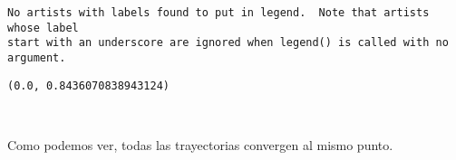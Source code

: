 \documentclass[11pt]{article}
\makeatletter
\newcommand{\boxspacing}{\kern\kvtcb@left@rule\kern\kvtcb@boxsep}
\newcommand{\prompt}[4]{
        {\ttfamily\llap{{\color{#2}[#3]:\hspace{3pt}#4}}\vspace{-\baselineskip}}
    }
\makeatother
\begin{document}
    \begin{Verbatim}[commandchars=\\\{\}]
No artists with labels found to put in legend.  Note that artists whose label
start with an underscore are ignored when legend() is called with no argument.
    \end{Verbatim}

            \begin{tcolorbox}[breakable, size=fbox, boxrule=.5pt, pad at break*=1mm, opacityfill=0]
\prompt{Out}{outcolor}{1255}{\boxspacing}
\begin{Verbatim}[commandchars=\\\{\}]
(0.0, 0.8436070838943124)
\end{Verbatim}
\end{tcolorbox}
        
    \begin{center}
    \end{center}
    { \hspace*{\fill} \\}
    
    Como podemos ver, todas las trayectorias convergen al mismo punto.


    
    
    
\end{document}

